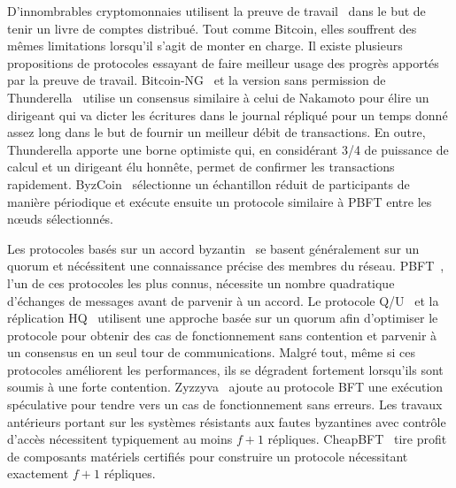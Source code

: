 {D'innombrables cryptomonnaies utilisent la preuve de travail~\cite{DworkN92, aspnes2005exposing} dans le but de tenir
un livre de comptes distribué. Tout comme Bitcoin, elles souffrent des mêmes limitations lorsqu'il s'agit de monter en
charge. Il existe plusieurs propositions de protocoles essayant de faire meilleur usage des progrès apportés par la
preuve de travail. Bitcoin-NG~\cite{EyalGSR16} et la version sans permission de Thunderella~\cite{PassS18} utilise
un consensus similaire à celui de Nakamoto pour élire un dirigeant qui va dicter les écritures dans le journal répliqué
pour un temps donné assez long dans le but de fournir un meilleur débit de transactions. En outre, Thunderella apporte
une borne optimiste qui, en considérant 3/4 de puissance de calcul et un dirigeant élu honnête, permet de confirmer les
transactions rapidement. ByzCoin~\cite{Kokoris-KogiasJ16} sélectionne un échantillon réduit de participants de manière
périodique et exécute ensuite un protocole similaire à PBFT entre les nœuds
sélectionnés.


Les protocoles basés sur un accord byzantin~\cite{PeaseSL80, LamportSP82} se basent généralement sur un quorum et
nécéssitent une connaissance précise des membres du réseau. PBFT~\cite{castro1999practical, CL02}, l'un de ces
protocoles les plus connus, nécessite un nombre quadratique d'échanges de messages avant de parvenir à un accord.
Le protocole Q/U~\cite{abd2005fault} et la réplication HQ~\cite{cowling2006hq} utilisent une approche basée sur un
quorum afin d'optimiser le protocole pour obtenir des cas de fonctionnement sans contention et parvenir à un consensus
en un seul tour de communications. Malgré tout, même si ces protocoles améliorent les performances, ils se dégradent
fortement lorsqu'ils sont soumis à une forte contention. Zyzzyva~\cite{KotlaADCW09} ajoute au protocole BFT une
exécution spéculative pour tendre vers un cas de fonctionnement sans erreurs. Les travaux antérieurs portant sur les
systèmes résistants aux fautes byzantines avec contrôle d'accès nécessitent typiquement au moins $f+1$ répliques.
CheapBFT~\cite{kapitza2012cheapbft} tire profit de composants matériels certifiés pour construire un protocole
nécessitant exactement $f+1$ répliques.

}
